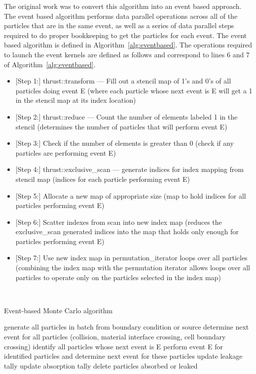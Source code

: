 %
The original work was to convert this algorithm into an event based approach.
%
The event based algorithm performs data parallel operations across all of the particles that are in the same event, as well as a series of data parallel steps required to do proper bookkeeping to get the particles for each event.
%
The event based algorithm is defined in Algorithm~\ref{alg:eventbased}.
%
The operations required to launch the event kernels are defined as follows and correspond to lines 6 and 7 of Algorithm~\ref{alg:eventbased}.
%
\begin{itemize}
\item{[Step 1:]} thrust::transform --- Fill out a stencil map of 1's and 0's of all particles doing event E (where each particle whose next event is E will get a 1 in the stencil map at its index location)
\item{[Step 2:]} thrust::reduce --- Count the number of elements labeled 1 in the stencil (determines the number of particles that will perform event E)
\item{[Step 3:]} Check if the number of elements is greater than 0 (check if any particles are performing event E)
\item{[Step 4:]} thrust::exclusive\_scan --- generate indices for index mapping from stencil map (indices for each particle performing event E)
\item{[Step 5:]} Allocate a new map of appropriate size (map to hold indices for all particles performing event E)
\item{[Step 6:]} Scatter indexes from scan into new index map (reduces the exclusive\_scan generated indices into the map that holds only enough for particles performing event E)
\item{[Step 7:]} Use new index map in permutation\_iterator loops over all particles (combining the index map with the permutation iterator allows loops over all particles to operate only on the particles selected in the index map)
\end{itemize}
~\cite{alpsmc1}
%

\begin{algorithm}
\DontPrintSemicolon
\caption{Event-based Monte Carlo algorithm}
\label{alg:eventbased}
{ 
    generate all particles in batch from boundary condition or source\;
    determine next event for all particles (collision, material interface crossing, cell boundary crossing)\;
    {
       {
          identify all particles whose next event is E\;
          perform event E for identified particles and determine next event for these particles\;
       }
       {
          update leakage tally\;
       }
       {
          update absorption tally\;
       }
       delete particles absorbed or leaked\;
    }
}
\end{algorithm}


